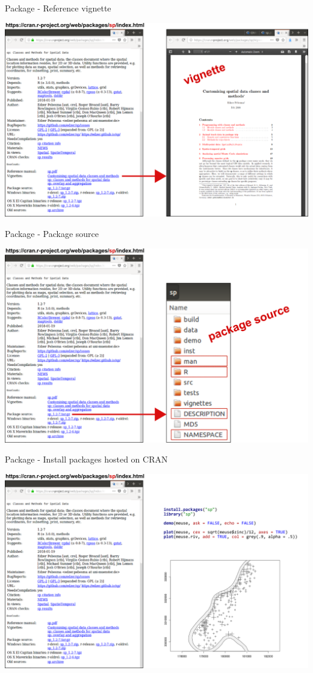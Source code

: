 \documentclass[8pt,ignorenonframetext,]{beamer}
\begin{document}
\begin{frame}{Package - Reference vignette}

\includegraphics{imgPres/documentation_02.png}

\end{frame}

\begin{frame}{Package - Package source}

\includegraphics{imgPres/documentation_03.png}

\end{frame}

\begin{frame}{Package - Install packages hosted on CRAN}

\includegraphics{imgPres/documentation_04.png}

\end{frame}
\end{document}

